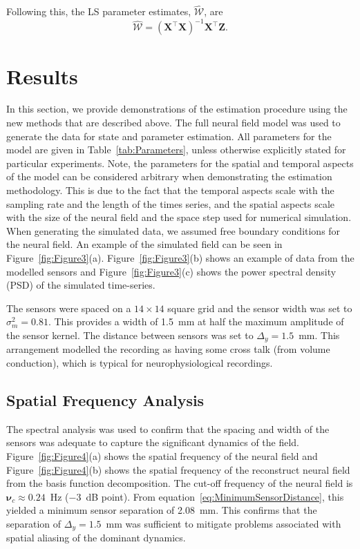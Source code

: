 \documentclass[12pt]{iopart}
\begin{document}
Following this, the LS parameter estimates, $ \hat{\mathcal{W}}$, are
\begin{equation}
	\hat{\mathcal{W}}=(\mathbf X^\top\mathbf X)^{-1}\mathbf X^\top\mathbf Z. 
\end{equation}

\section{Results}\label{ResultsSection} In this section, we provide demonstrations of the estimation procedure using the new methods that are described above. The full neural field model was used to generate the data for state and parameter estimation. All parameters for the model are given in Table~\ref{tab:Parameters}, unless otherwise explicitly stated for particular experiments. Note, the parameters for the spatial and temporal aspects of the model can be considered arbitrary when demonstrating the estimation methodology. This is due to the fact that the temporal aspects scale with the sampling rate and the length of the times series, and the spatial aspects scale with the size of the neural field and the space step used for numerical simulation. When generating the simulated data, we assumed free boundary conditions for the neural field. An example of the simulated field can be seen in Figure~\ref{fig:Figure3}(a). Figure~\ref{fig:Figure3}(b) shows an example of data from the modelled sensors and Figure~\ref{fig:Figure3}(c) shows the power spectral density (PSD) of the simulated time-series. %

The sensors were spaced on a $14 \times 14$ square grid and the sensor width was set to $\sigma^2_m = 0.81$. This provides a width of 1.5~mm at half the maximum amplitude of the sensor kernel. The distance between sensors was set to $\Delta_y = 1.5$~mm. This arrangement modelled the recording as having some cross talk (from volume conduction), which is typical for neurophysiological recordings.

\subsection{Spatial Frequency Analysis}
The spectral analysis was used to confirm that the spacing and width of the sensors was adequate to capture the significant dynamics of the field. Figure~\ref{fig:Figure4}(a) shows the spatial frequency of the neural field and Figure~\ref{fig:Figure4}(b) shows the spatial frequency of the reconstruct neural field from the basis function decomposition. The cut-off frequency of the neural field is $\boldsymbol{\nu}_c \approx 0.24$~Hz ($-3$~dB point). From equation~\ref{eq:MinimumSensorDistance}, this yielded a minimum sensor separation of 2.08~mm. This confirms that the separation of $\Delta_{y} = 1.5$~mm was sufficient to mitigate problems associated with spatial aliasing of the dominant dynamics.
\end{document}
